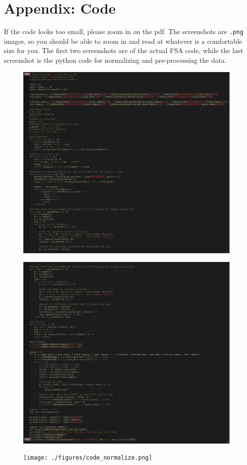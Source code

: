\documentclass[UTF8]{article}
\begin{document}
\section{Appendix: Code}
If the code looks too small, please zoom in on the pdf.
The screenshots are \texttt{.png} images, so you should be able to zoom in and read at whatever is a comfortable size for you.
The first two screenshots are of the actual FSA code, while the last screenshot is the python code for normalizing and pre-processing the data.
\begin{figure}[H]
    \centering
    \includegraphics[scale=0.6]{./figures/code1.png}
\end{figure}
\begin{figure}[H]
    \centering
    \includegraphics[scale=0.6]{./figures/code2.png}
\end{figure}
\begin{figure}[H]
    \centering
    \texttt{[image: ./figures/code\_normalize.png]}
\end{figure}
\end{document}
